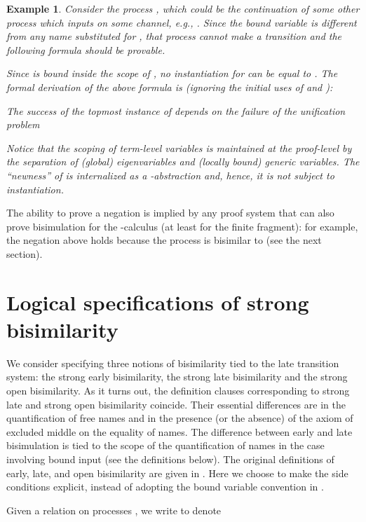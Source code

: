 \documentclass{acmtrans2m}
\newenvironment{example}{\begin{exa} \rm}{\end{exa}}
\newtheorem{exa}[theorem]{Example}
\begin{document}
\begin{example}
\label{ex:one step negative}
Consider the process , which could be the
continuation of some other process which inputs  on some channel,
{\em e.g.}, .  
Since the bound variable  is different from
any name substituted for , that process cannot make
a transition and the following formula should be provable.
 
Since  is bound inside the
scope of ,  no instantiation for  can be equal to .
The formal derivation of the above formula is (ignoring the initial 
uses of  and ):

The success of the topmost instance of  depends on the failure of 
the unification problem

Notice that the scoping of term-level variables is maintained at the proof-level
by the separation of (global) eigenvariables and (locally bound) generic variables.
The ``newness'' of  is internalized as a -abstraction and, hence,
it is not subject to instantiation. 
\end{example}

The ability to prove a negation is implied by any proof system that
can also prove bisimulation for the -calculus (at least for
the finite fragment): for
example, the negation above holds because the process
 is bisimilar to  (see the next
section). 


\section{Logical specifications of strong bisimilarity}
\label{sec:bisim}

We consider specifying three notions of bisimilarity tied to the late
transition system: the strong early bisimilarity, the strong late bisimilarity 
and the strong open bisimilarity.  As it turns out, the definition clauses
corresponding to strong late and strong open bisimilarity coincide.
Their essential differences are in the quantification of free names
and in the presence (or the absence) of the axiom of excluded middle
on the equality of names.
The difference between early and late bisimulation is tied to the scope
of the quantification of names in the case involving bound input (see the
definitions below).
The original definitions of early, late, and open bisimilarity are given in 
\cite{milner92icII,sangiorgi01}.  Here we choose to make the
side conditions explicit, instead of adopting the bound variable
convention in \cite{sangiorgi01}.

Given a relation on processes , we write 
to denote 
\end{document}
